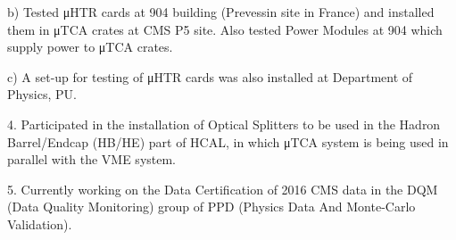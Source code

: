 b) Tested μHTR cards at 904 building (Prevessin site in France) and installed them in μTCA crates at CMS P5 site. Also tested Power Modules at 904 which supply power to μTCA crates.

c) A set-up for testing of μHTR cards was also installed at Department of Physics, PU.

4. Participated in the installation of Optical Splitters to be used in the Hadron Barrel/Endcap
 (HB/HE) part of HCAL, in which μTCA system is being used in parallel with the VME system.

5. Currently working on the Data Certification of 2016 CMS data in the DQM (Data Quality Monitoring) group of PPD (Physics Data And Monte-Carlo Validation).

